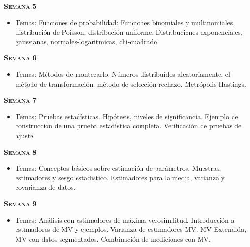 \documentclass[letterpaper,10pt,onecolumn]{article}
\begin{document}
\noindent\textbf{\textsc{Semana 5}}\\[-0.5cm]
\begin{itemize}
\item Temas: Funciones de probabilidad: Funciones binomiales y multinomiales, distribuci\'on de Poisson, distribuci\'on uniforme. Distribuciones exponenciales, gaussianas, normales-logaritmicas, chi-cuadrado. \\[-0.6cm]
\end{itemize}


\noindent\textbf{\textsc{Semana 6}}\\[-0.5cm]
\begin{itemize}
\item Temas:  M\'etodos de montecarlo: N\'umeros distribu\'idos aleatoriamente, el m\'etodo de transformaci\'on, m\'etodo de selecci\'on-rechazo. Metr\'opolis-Hastings. \\[-0.6cm]
\end{itemize}


\noindent\textbf{\textsc{Semana 7}}\\[-0.5cm]
\begin{itemize}
\item Temas: Pruebas estad\'isticas. Hip\'otesis, niveles de significancia. Ejemplo de construcci\'on de una prueba estad\'istica completa. Verificaci\'on de pruebas de ajuste. \\[-0.6cm]
\end{itemize}

\noindent\textbf{\textsc{Semana 8}}\\[-0.5cm]
\begin{itemize}
\item Temas: Conceptos b\'asicos sobre estimaci\'on de par\'ametros. Muestras, estimadores y sesgo estad\'istico. Estimadores para la media, varianza y covarianza de datos. \\[-0.6cm]
\end{itemize}


\noindent\textbf{\textsc{Semana 9}}\\[-0.5cm]
\begin{itemize}
\item Temas: An\'alisis con estimadores de m\'axima verosimilitud. Introducci\'on a estimadores de MV y ejemplos. Varianza de estimadores MV. MV Extendida, MV con datos segmentados. Combinaci\'on de mediciones con MV. \\[-0.6cm]
\\[-0.6cm]
\end{itemize}
\end{document}
